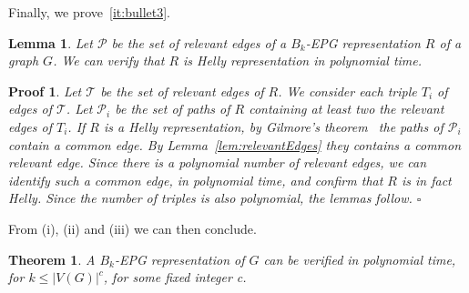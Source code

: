 \documentclass[9pt]{entcs}
\newtheorem{teo}{Theorem}[section]
\newtheorem{lema}{Lemma}[section]
\newtheorem{prove}{Proof}[section]
\begin{document}


 

Finally, we prove~\ref{it:bullet3}.


\begin{lema}
Let $\mathcal{P}$ be the set of relevant edges of a $B_k$-EPG representation $R$ of a graph $G$. We can verify that $R$ is Helly representation in polynomial time.
\end{lema}
\setcounter{prove}{2}

\begin{prove}
Let $\mathcal{T}$ be the set of relevant edges of $R$. We consider each triple $T_i$ of edges of $\mathcal{T}$. Let $\mathcal{P}_i$ be the set of paths of $R$ containing at least two the relevant edges of $T_i$. If $R$ is a Helly representation, by Gilmore's theorem~\cite{bergeDuchet1975} the paths of $\mathcal{P}_i$  contain a common edge.  By Lemma~\ref{lem:relevantEdges} they contains a common relevant edge. Since there is a polynomial number of relevant edges, we can identify such a common edge, in polynomial time, and confirm that $R$ is in fact Helly. Since the number of triples is also polynomial, the lemmas follow.
$\square$ \end{prove}

From (i), (ii) and (iii) we can then conclude.

\begin{teo} \label{teo:npdificuldade}
A $B_k$-EPG representation of $G$ can be verified in polynomial time, for $k\leq |V(G)|^c$, for some fixed integer c.
\end{teo}
\end{document}
